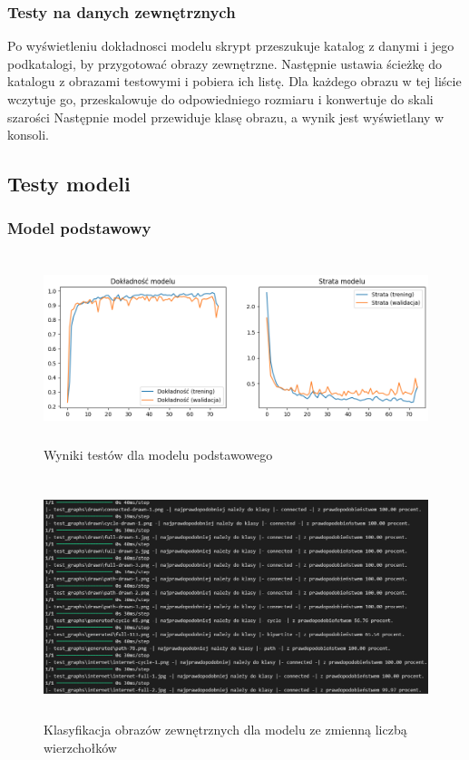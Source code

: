 \subsubsection{Testy na danych zewnętrznych}
Po wyświetleniu dokładnosci modelu skrypt przeszukuje katalog z danymi i jego podkatalogi, by przygotować obrazy zewnętrzne.
Następnie ustawia ścieżkę do katalogu z obrazami testowymi i pobiera ich listę.
Dla każdego obrazu w tej liście wczytuje go, przeskalowuje do odpowiedniego rozmiaru i konwertuje do skali szarości
Następnie model przewiduje klasę obrazu, a wynik jest wyświetlany w konsoli.

\subsection{Testy modeli}
\subsubsection{Model podstawowy}

\begin{figure}[ht]
	\centering
	\includegraphics[height=5.5cm]{partials/images/tests/v2_epoch75.png}
	\caption{Wyniki testów dla modelu podstawowego}
	\label{Fig:tests-base-1}
\end{figure}
\FloatBarrier

\begin{figure}[ht]
	\centering
	\includegraphics[height=7cm]{partials/images/tests/v2_epoch75_img_tests.png}
	\caption{Klasyfikacja obrazów zewnętrznych dla modelu ze zmienną liczbą wierzchołków}
	\label{Fig:tests-base-2}
\end{figure}
\FloatBarrier


